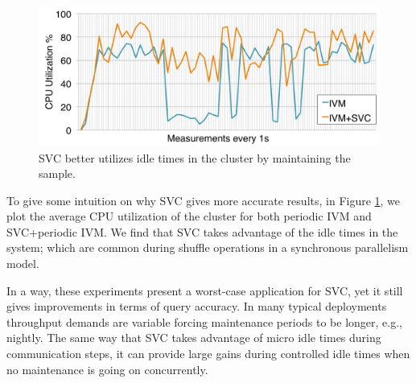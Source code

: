 \begin{figure}[t]
\centering
\includegraphics[scale=0.12]{exp/con_7.pdf}
 \caption{SVC better utilizes idle times in the cluster by maintaining the sample.\label{conv-5}} 
\end{figure}
To give some intuition on why SVC gives more accurate results, in Figure \ref{conv-5}, we plot the average CPU utilization of the cluster for both periodic IVM and SVC+periodic IVM. 
We find that SVC takes advantage of the idle times in the system; which are common during shuffle operations in a synchronous parallelism model.

In a way, these experiments present a worst-case application for SVC, yet it still gives improvements in terms of query accuracy.
In many typical deployments throughput demands are variable forcing maintenance periods to be longer, e.g., nightly.
The same way that SVC takes advantage of micro idle times during communication steps, it can provide large gains during controlled idle times when no maintenance is going on concurrently.


